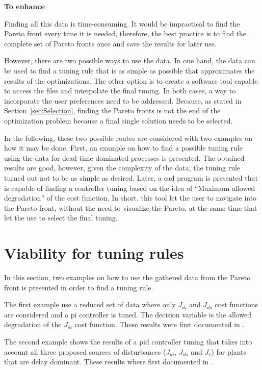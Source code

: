 \textbf{To enhance}

Finding all this data is time-consuming. It would be impractical to find the Pareto front every time it is needed, therefore, the best practice is to find the complete set of Pareto fronts once and save the results for later use.

However, there are two possible ways to use the data. In one hand, the data can be used to find a tuning rule that is as simple as possible that approximates the results of the optimizations. The other option is to create a software tool capable to access the files and interpolate the final tuning. In both cases, a way to incorporate the user preferences need to be addressed. Because, as stated in Section~\ref{sec:Selection}, finding the Pareto fronts is not the end of the optimization problem because a final single solution needs to be selected.

In the following, these two possible routes are considered with two examples on how it may be done. First, an example on how to find a possible tuning rule using the data for dead-time dominated processes is presented. The obtained results are good, however, given the complexity of the data, the tuning rule turned out not to be as simple as desired. Later, a \gls{cad} program is presented that is capable of finding a controller tuning based on the idea of ``Maximum allowed degradation'' of the cost function. In short, this tool let the user to navigate into the Pareto front, without the need to visualize the Pareto, at the same time that let the use to select the final tuning.

\section{Viability for tuning rules}
\label{sec:TuningRulesMOOP}
In this section, two examples on how to use the gathered data from the Pareto front is presented in order to find a tuning rule.

The first example use a reduced set of data where only $J_{di}$ and $J_{do}$ cost functions are considered and a \gls{pi} controller is tuned. The decision variable is the allowed degradation of the $J_{di}$ cost function. These results were first documented in \cite{ContrerasLeiva2015a}. 

The second example shows the results of a \gls{pid} controller tuning that takes into account all three proposed sources of disturbances ($J_{di}$, $J_{do}$ and $J_r$) for plants that are delay dominant. These results where first documented in \cite{Moya2017}.

